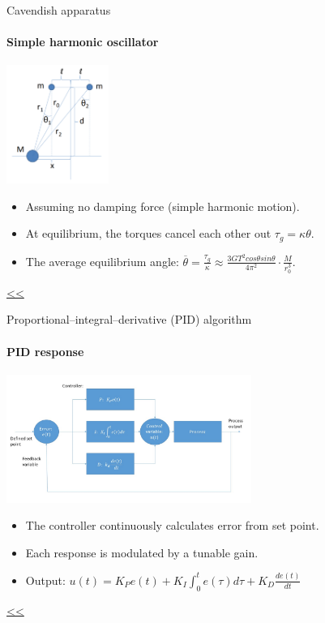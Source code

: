 \documentclass{beamer}
\begin{document}
\begin{frame}{Cavendish apparatus}
	\framesubtitle{Simple harmonic oscillator}
	\begin{center}		
		\includegraphics[width=0.25\textwidth,keepaspectratio]{Cavendish apparatus.PNG}
    \end{center}
	\begin{itemize}
		\item Assuming no damping force (simple harmonic motion).
		\item At equilibrium, the torques cancel each other out $\tau_g =  \kappa\theta$.
		\item The average equilibrium angle: $\overline{\theta} = \frac{\tau_g}{\kappa} \approx \frac{3GT^2cos\theta sin\theta}{4\pi^2 } \cdot \frac{M}{r_0^3}$.
		
	\end{itemize}
	\hyperlink{frame:Cavendish apparatus}{<<} 

\end{frame}


\begin{frame}{\hypertarget{frame:Proportional–integral–derivative (PID) algorithm 1}{Proportional–integral–derivative (PID) algorithm}}
	\framesubtitle{PID response}
	\begin{center}		
		\includegraphics[width=0.6\textwidth,keepaspectratio]{pid_diagram_powerpoint.jpg}
    \end{center}
	\begin{itemize}
		\item The controller continuously calculates error from set point. 
		\item Each response is modulated by a tunable gain. 
		\item Output: $u(t) = K_P e(t)+K_I\int_{0}^{t}e(\tau)d\tau+K_D\frac{de(t)}{dt}$		
	\end{itemize}
	\hyperlink{frame:Proportional–integral–derivative (PID) algorithm}{<<} 
\end{frame}
\end{document}
